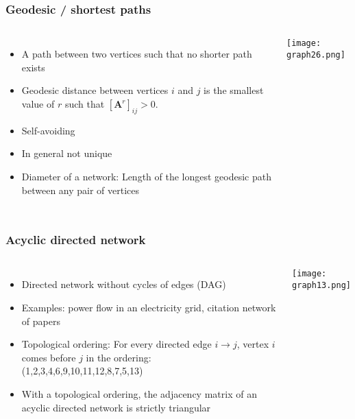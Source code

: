 \documentclass[10pt,aspectratio=169,dvipsnames]{beamer}
\let\olditem\item
\renewcommand{\item}{%
\olditem\vspace{5pt}}
\begin{document}
\begin{frame}
\frametitle{Geodesic / shortest paths}
\begin{columns}
\begin{itemize}
\item A path between two vertices such that no shorter path exists
\item Geodesic distance between vertices $i$ and $j$ is the smallest value of $r$ such that
$\left[\mathbf{A}^{r}\right]_{ij}>0$.
\item Self-avoiding
\item In general not unique
\item \alert{Diameter} of a network: Length of the longest geodesic path between any pair of vertices
\end{itemize}
\texttt{[image: graph26.png]}
\end{columns}
\end{frame}

\begin{frame}
\frametitle{Acyclic directed network}
\begin{columns}
\begin{itemize}
\item Directed network without cycles of edges (DAG)
\item Examples: power flow in an electricity grid, citation network of papers
\item Topological ordering: For every directed edge $i\to j$, vertex $i$ comes before $j$ in the ordering:\\(1,2,3,4,6,9,10,11,12,8,7,5,13)
\item With a topological ordering, the adjacency matrix of an acyclic directed network is \alert{strictly triangular}
\end{itemize}
\texttt{[image: graph13.png]}
\end{columns}
\end{frame}
\end{document}
